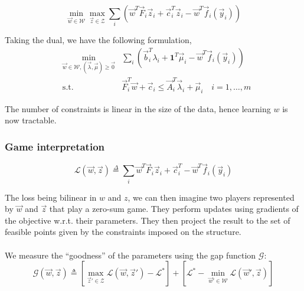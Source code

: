 \documentclass{article}
\begin{document}
\begin{equation}
  \min_{\vec w \in \mathcal{W}} \max_{\vec z \in \mathcal{Z}} \sum_i \left( \vec
w^T \vec F_i \vec z_i + \vec c_i^T \vec z_i - \vec w^T \vec f_i(\vec y_i)
\right)
  \label{saddle_point}
\end{equation}

Taking the dual, we have the following formulation,
\begin{equation}
  \begin{aligned}
    &\min_{\vec w \in \mathcal{W}, (\vec \lambda,\vec \mu) \geq \vec 0} &\sum_i
\left( \vec b_i^T \lambda_i + \mathbf{1}^T \vec \mu_i - \vec w^T \vec f_i(\vec
y_i) \right)\\ &\text{s.t.} &\vec F_i^T \vec w + \vec c_i \leq \vec A_i^T \vec
\lambda_i + \vec \mu_i \quad i=1,\dots,m
  \end{aligned}
\end{equation}

The number of constraints is linear in the size of the data, hence learning $w$ is now tractable.

\subsubsection{Game interpretation}
\begin{equation}
  \mathcal{L}(\vec w,\vec z) \overset{\Delta}{=} \sum_i \vec w^T \vec F_i \vec z_i + \vec
c_i^T - \vec w^T \vec f_i(\vec y_i)
  \label{saddle_obj}
\end{equation}

The loss being bilinear in $w$ and $z$, we can then imagine two players represented by
$\vec w$ and $\vec z$ that play a zero-sum game. They perform updates using gradients of
the objective w.r.t. their parameters. They then project the result to the set
of feasible points given by the constraints imposed on the structure.\\ 
\\
We measure the ``goodness'' of the parameters using the gap function
$\mathcal{G}$:
\begin{equation}
  \mathcal{G}(\vec w, \vec z) \triangleq \left[ \max_{\vec z' \in \mathcal{Z}}
\mathcal{L}(\vec w,\vec z') - \mathcal{L}^* \right] + \left[ \mathcal{L}^* -
\min_{\vec w' \in \mathcal{W}} \mathcal{L}(\vec w', \vec z) \right]
\end{equation}
\end{document}
